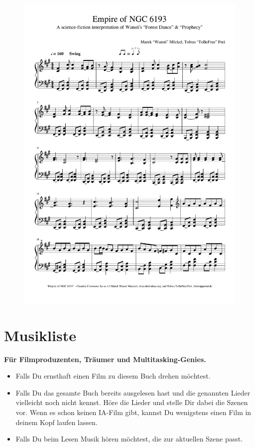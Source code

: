 \begin{figure}[p]
    \includegraphics[width=\textwidth, page=3]{z-include-ia3theme.pdf}
\end{figure}


\chapter{Musikliste}

\textbf{Für Filmproduzenten, Träumer und Multitasking-Genies.}

\begin{itemize}
    \item Falls Du ernsthaft einen Film zu diesem Buch drehen möchtest.
    \item Falls Du das gesamte Buch bereits ausgelesen hast und die genannten Lieder vielleicht noch nicht kennst. Höre die Lieder und stelle Dir dabei die Szenen vor. Wenn es schon keinen IA-Film gibt, kannst Du wenigstens einen Film in deinem Kopf laufen lassen.
    \item Falls Du beim Lesen Musik hören möchtest, die zur aktuellen Szene passt.
\end{itemize}

